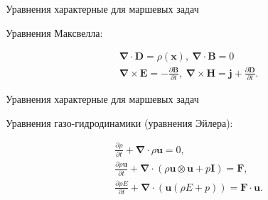 \documentclass[10pt,xcolor=pst,aspectratio=169]{beamer}
\begin{document}
\begin{frame}{Уравнения характерные для маршевых задач}

    \transdissolve[duration=0.1]
    \justifying
    \large

    Уравнения Максвелла:

    \[
        \begin{split}
            &\bm{\nabla} \cdot \mathbf{D} = \rho (\mathbf{x}), \:
            \bm{\nabla} \cdot \mathbf{B} = 0 \\ 
            &\bm{\nabla} \times \mathbf{E} = - \frac{\partial \mathbf{B}}{\partial t}, \:
            \bm{\nabla} \times \mathbf{H} = \mathbf{j} + \frac{\partial \mathbf{D}}{\partial t}.
        \end{split}
    \]

\end{frame}

\begin{frame}{Уравнения характерные для маршевых задач}

    \transdissolve[duration=0.1]
    \justifying
    \large

    Уравнения газо-гидродинамики (уравнения Эйлера):

    \[
        \begin{split}
            &\frac{\partial \rho}{\partial t}
                + \bm{\nabla} \cdot \rho \mathbf{u}
                = 0, \\
            &\frac{\partial \rho \mathbf{u}}{\partial t}
                + \bm{\nabla} \cdot \left( \rho \mathbf{u} \otimes \mathbf{u} + p \mathbf{I} \right)
                =
                \mathbf{F}, \\
            &\frac{\partial \rho E}{\partial t}
                + \bm{\nabla} \cdot \left( \mathbf{u} \left( \rho E + p \right) \right)
                =
                \mathbf{F} \cdot \mathbf{u}.
            \end{split}
    \]

\end{frame}
\end{document}
